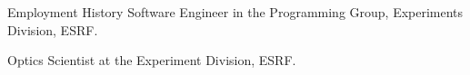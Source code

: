 \begin{rubric}{Employment History}
\entry*[1993 –- 1999] 	Software Engineer in the Programming Group, Experiments Division, ESRF.


\entry*[1990 –- 1992]	Optics Scientist at the Experiment Division, ESRF.


\end{rubric}